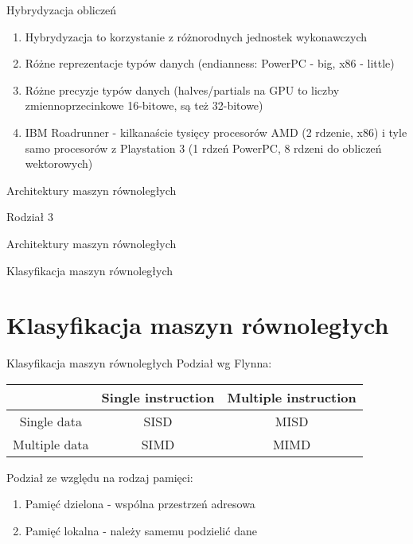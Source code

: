 \documentclass{beamer}
\begin{document}
\begin{frame}{Hybrydyzacja obliczeń}
  \begin{enumerate}
  \item Hybrydyzacja to korzystanie z różnorodnych jednostek wykonawczych
  \item Różne reprezentacje typów danych (endianness: PowerPC - big, x86 - little)
  \item Różne precyzje typów danych (halves/partials na GPU to liczby zmiennoprzecinkowe 16-bitowe, są też 32-bitowe)
  \item IBM Roadrunner - kilkanaście tysięcy procesorów AMD (2 rdzenie, x86) i tyle samo procesorów z Playstation 3 (1 rdzeń PowerPC, 8 rdzeni do obliczeń wektorowych)
  \end{enumerate}
\end{frame}

\begin{frame}{Architektury maszyn równoległych}
  \huge
  \begin{center}
    Rodział 3

    Architektury maszyn równoległych

    \large

    Klasyfikacja maszyn równoległych
  \end{center}
\end{frame}

\section{Klasyfikacja maszyn równoległych}

\begin{frame}{Klasyfikacja maszyn równoległych}
  Podział wg Flynna:
  \begin{tabular}{ | c | c | c | }
    \hline
    & Single instruction & Multiple instruction \\
    \hline
    Single data   & SISD               & MISD                 \\
    \hline
    Multiple data & SIMD               & MIMD                 \\
    \hline
  \end{tabular}

\vspace{2cm}

  Podział ze względu na rodzaj pamięci:
  \begin{enumerate}
  \item Pamięć dzielona - wspólna przestrzeń adresowa
  \item Pamięć lokalna - należy samemu podzielić dane
  \end{enumerate}
\end{frame}
\end{document}
